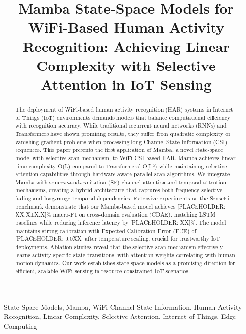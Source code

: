 \documentclass[journal]{IEEEtran}
\begin{document}
\title{Mamba State-Space Models for WiFi-Based Human Activity Recognition: Achieving Linear Complexity with Selective Attention in IoT Sensing}

\author{
}

\maketitle

\begin{abstract}
The deployment of WiFi-based human activity recognition (HAR) systems in Internet of Things (IoT) environments demands models that balance computational efficiency with recognition accuracy. While traditional recurrent neural networks (RNNs) and Transformers have shown promising results, they suffer from quadratic complexity or vanishing gradient problems when processing long Channel State Information (CSI) sequences. This paper presents the first application of Mamba, a novel state-space model with selective scan mechanism, to WiFi CSI-based HAR. Mamba achieves linear time complexity O(L) compared to Transformers' O(L²) while maintaining selective attention capabilities through hardware-aware parallel scan algorithms. We integrate Mamba with squeeze-and-excitation (SE) channel attention and temporal attention mechanisms, creating a hybrid architecture that captures both frequency-selective fading and long-range temporal dependencies. Extensive experiments on the SenseFi benchmark demonstrate that our Mamba-based model achieves [PLACEHOLDER: XX.X±X.X]\% macro-F1 on cross-domain evaluation (CDAE), matching LSTM baselines while reducing inference latency by [PLACEHOLDER: XX]\%. The model maintains strong calibration with Expected Calibration Error (ECE) of [PLACEHOLDER: 0.0XX] after temperature scaling, crucial for trustworthy IoT deployments. Ablation studies reveal that the selective scan mechanism effectively learns activity-specific state transitions, with attention weights correlating with human motion dynamics. Our work establishes state-space models as a promising direction for efficient, scalable WiFi sensing in resource-constrained IoT scenarios.
\end{abstract}

\begin{IEEEkeywords}
State-Space Models, Mamba, WiFi Channel State Information, Human Activity Recognition, Linear Complexity, Selective Attention, Internet of Things, Edge Computing
\end{IEEEkeywords}
\end{document}
